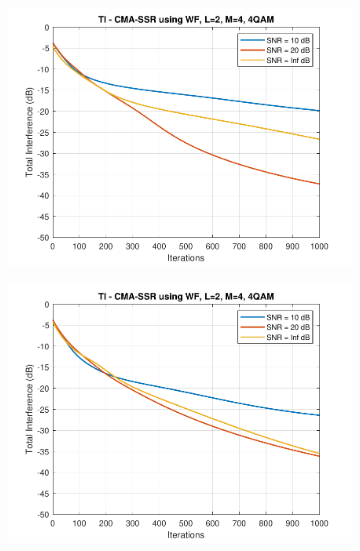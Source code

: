 \begin{figure}
\begin{subfigure}[b]{0.45\textwidth}
		\includegraphics[width=\linewidth]{./figs/BF_WF_TI_4QAM_L=2_M=4_K=200.pdf}
		\label{fig:wf_ti200}
	\end{subfigure}
	\begin{subfigure}[b]{0.45\textwidth}
		\includegraphics[width=\linewidth]{./figs/BF_WF_TI_4QAM_L=2_M=4_K=1000.pdf}
		\label{fig:wf_ti1000}
	\end{subfigure}
	\begin{subfigure}[b]{0.45\textwidth}

\end{subfigure}
\end{figure}
